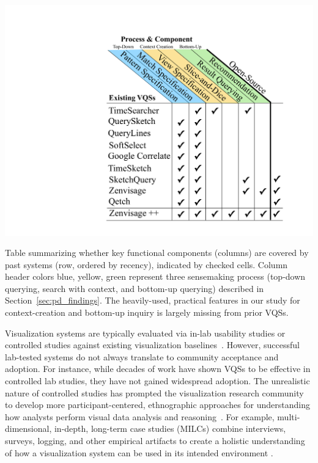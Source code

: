   \begin{table}[ht!]
    \vspace*{-10pt}
     \centering
     \includegraphics[width=0.8\linewidth]{figures/related_works_table.pdf}
     \caption{Table summarizing whether key functional components (columns) are covered by past systems (row, ordered by recency), indicated by checked cells. Column header colors blue, yellow, green represent three sensemaking process (top-down querying, search with context, and bottom-up querying) described in Section~\ref{sec:pd_findings}. The heavily-used, practical features in our study for context-creation and bottom-up inquiry is largely missing from prior VQSs.}
     \label{table:relatedwork}
     \vspace*{-10pt}
  \end{table}
  \par {}
  \npar Visualization systems are typically evaluated via in-lab usability studies or controlled studies against existing visualization baselines~\cite{Plaisant2004,North2006,Yi2008}. However, successful lab-tested systems do not always translate to community acceptance and adoption. For instance, while decades of work have shown VQSs to be effective in controlled lab studies, they have not gained widespread adoption. The unrealistic nature of controlled studies has prompted the visualization research community to develop more participant-centered, ethnographic approaches for understanding how analysts perform visual data analysis and reasoning~\cite{Plaisant2004,lam2012empirical,shneiderman2006strategies,munzner2009nested,Sedlmair2012}. For example, multi-dimensional, in-depth, long-term case studies (MILCs) combine interviews, surveys, logging, and other empirical artifacts to create a holistic understanding of how a visualization system can be used in its intended environment \cite{shneiderman2006strategies}. 
